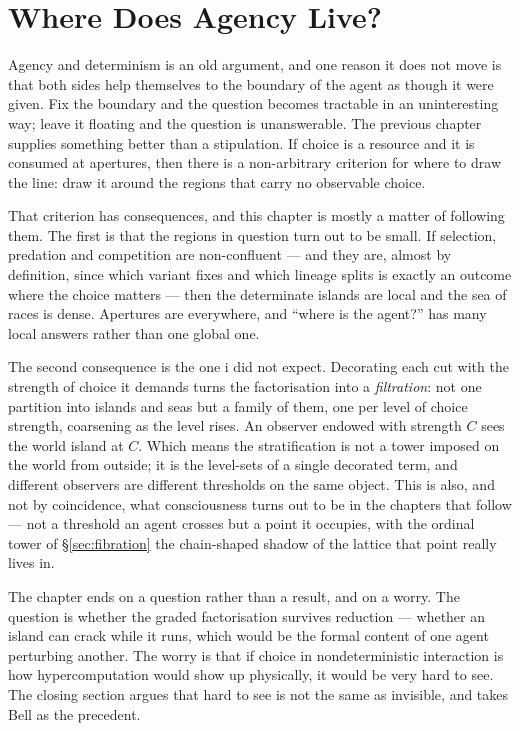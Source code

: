 \chapter{Where Does Agency Live?}
\label{ch:agy}

\noindent
Agency and determinism is an old argument, and one reason it does not move is that
both sides help themselves to the boundary of the agent as though it were given. Fix
the boundary and the question becomes tractable in an uninteresting way; leave it
floating and the question is unanswerable. The previous chapter supplies something
better than a stipulation. If choice is a resource and it is consumed at apertures,
then there is a non-arbitrary criterion for where to draw the line: draw it around the
regions that carry no observable choice.

That criterion has consequences, and this chapter is mostly a matter of following them.
The first is that the regions in question turn out to be small. If selection, predation
and competition are non-confluent --- and they are, almost by definition, since which
variant fixes and which lineage splits is exactly an outcome where the choice matters
--- then the determinate islands are local and the sea of races is dense. Apertures are
everywhere, and ``where is the agent?'' has many local answers rather than one global
one.

The second consequence is the one i did not expect. Decorating each cut with the
strength of choice it demands turns the factorisation into a \emph{filtration}: not one
partition into islands and seas but a family of them, one per level of choice strength,
coarsening as the level rises. An observer endowed with strength $C$ sees the world
island at $C$. Which means the stratification is not a tower imposed on the world from
outside; it is the level-sets of a single decorated term, and different observers are
different thresholds on the same object. This is also, and not by coincidence, what
consciousness turns out to be in the chapters that follow --- not a threshold an agent
crosses but a point it occupies, with the ordinal tower of \S\ref{sec:fibration} the
chain-shaped shadow of the lattice that point really lives in.

The chapter ends on a question rather than a result, and on a worry. The question is
whether the graded factorisation survives reduction --- whether an island can crack
while it runs, which would be the formal content of one agent perturbing another. The
worry is that if choice in nondeterministic interaction is how hypercomputation would
show up physically, it would be very hard to see. The closing section argues that hard
to see is not the same as invisible, and takes Bell as the precedent.

